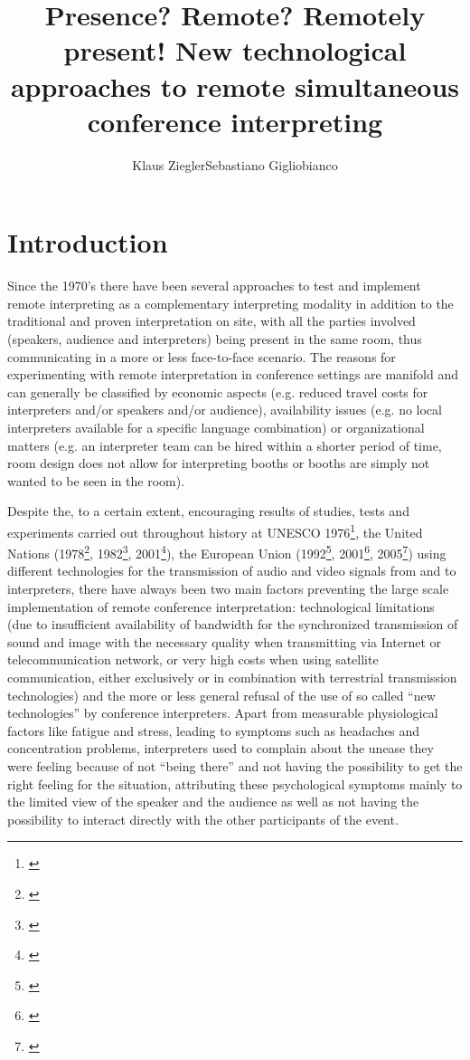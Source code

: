 \documentclass[output=paper]{langsci/langscibook}
\author{Klaus Ziegler\affiliation{affiliation}\lastand Sebastiano Gigliobianco\affiliation{affiliation}}
\title{Presence? Remote? Remotely present! New technological approaches to remote simultaneous conference interpreting}
\begin{document}
\section{Introduction}
\label{sec:ziegler:01}
Since the 1970’s there have been several approaches to test and implement remote interpreting as a complementary interpreting modality in addition to the traditional and proven interpretation on site, with all the parties involved (speakers, audience and interpreters) being present in the same room, thus communicating in a more or less face-to-face scenario. The reasons for experimenting with remote interpretation in conference settings are manifold and can generally be classified by economic aspects (e.g. reduced travel costs for interpreters and/or speakers and/or audience), availability issues (e.g. no local interpreters available for a specific language combination) or organizational matters (e.g. an interpreter team can be hired within a shorter period of time, room design does not allow for interpreting booths or booths are simply not wanted to be seen in the room). 

Despite the, to a certain extent, encouraging results of studies, tests and experiments carried out throughout history at UNESCO 1976\footnote{\citealt{Kurz2000}}, the United Nations (1978\footnote{\citealt{Chernov2004}}, 1982\footnote{\citet{UNESCO1987}}, 2001\footnote{\citealt{Mouzourakis2006}}), the European Union (1992\footnote{\citealt{Kurz2000}}, 2001\footnote{\citealt{Europarl2001}}, 2005\footnote{\citealt{Roziner2010}}) using different technologies for the transmission of audio and video signals from and to interpreters, there have always been two main factors preventing the large scale implementation of remote conference interpretation: technological limitations (due to insufficient availability of bandwidth for the synchronized transmission of sound and image with the necessary quality when transmitting via Internet or telecommunication network, or very high costs when using satellite communication, either exclusively or in combination with terrestrial transmission technologies) and the more or less general refusal of the use of so called “new technologies” by conference interpreters. Apart from measurable physiological factors like fatigue and stress, leading to symptoms such as headaches and concentration problems, interpreters used to complain about the unease they were feeling because of not “being there” \citep{Mouzourakis2006} and not having the possibility to get the right feeling for the situation, attributing these psychological symptoms mainly to the limited view of the speaker and the audience as well as not having the possibility to interact directly with the other participants of the event.
\end{document}

